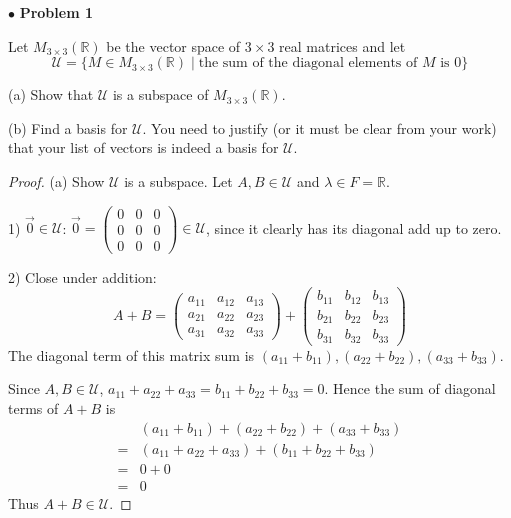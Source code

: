 \documentclass{article}
\begin{document}
$ \bullet$ \textbf{Problem 1}
\medskip

\begin{itshape}
Let $M_{3 \times 3}(\mathbb{R})$ be the vector space of $3 \times 3$ real matrices and let $$\mathcal{U} = \{ M \in M_{3 \times 3}(\mathbb{R}) \; | \; \text{the sum of the diagonal elements of $M$ is 0} \} $$

(a) Show that $\mathcal{U}$ is a subspace of $M_{3 \times 3}(\mathbb{R})$.
\medskip

(b) Find a basis for $\mathcal{U}$. You need to justify (or it must be clear from your work) that your list of vectors is indeed a basis for $\mathcal{U}$.
\end{itshape}
\medskip

\begin{proof}
(a) Show $\mathcal{U}$ is a subspace. Let $A, B \in \mathcal{U}$ and $\lambda \in F = \mathbb{R}$.
\smallskip

1) $\vec{0} \in \mathcal{U}$: $\vec{0} = \begin{pmatrix} 0&0&0\\0&0&0\\0&0&0 \end{pmatrix} \in \mathcal{U}$, since it clearly has its diagonal add up to zero.
\smallskip

2) Close under addition: 
$$
A+B = \begin{pmatrix} a_{11}&a_{12}&a_{13} \\a_{21}&a_{22}&a_{23}\\a_{31}&a_{32}&a_{33}\end{pmatrix} +\begin{pmatrix} b_{11}&b_{12}&b_{13} \\b_{21}&b_{22}&b_{23}\\b_{31}&b_{32}&b_{33}\end{pmatrix} 
$$
The diagonal term of this matrix sum is $(a_{11} + b_{11}), (a_{22} + b_{22}), (a_{33} + b_{33})$.

Since $A, B \in \mathcal{U}$, $a_{11}+a_{22}+a_{33} = b_{11}+b_{22}+b_{33}=0$. Hence the sum of diagonal terms of $A+B$ is 
\begin{align*}
&(a_{11} + b_{11})+ (a_{22} + b_{22})+ (a_{33} + b_{33}) \\
=& (a_{11}+a_{22}+a_{33}) + (b_{11}+b_{22}+b_{33}) \\
=& 0 + 0 \\
=& 0
\end{align*}
Thus $A+B \in \mathcal{U}$.
\smallskip


\end{proof}
\end{document}
